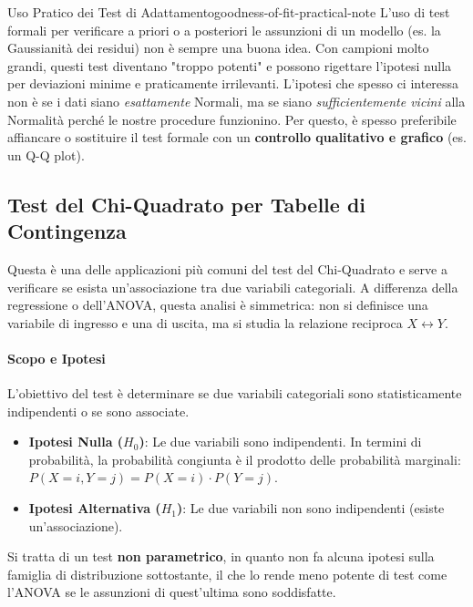 \begin{nota}{Uso Pratico dei Test di
Adattamento}{goodness-of-fit-practical-note}
L'uso di test formali per verificare a priori o a posteriori le assunzioni di un
modello (es. la Gaussianità dei residui) non è sempre una buona idea. Con
campioni molto grandi, questi test diventano "troppo potenti" e possono
rigettare l'ipotesi nulla per deviazioni minime e praticamente irrilevanti.
L'ipotesi che spesso ci interessa non è se i dati siano \textit{esattamente}
Normali, ma se siano \textit{sufficientemente vicini} alla Normalità perché le
nostre procedure funzionino. Per questo, è spesso preferibile affiancare o
sostituire il test formale con un \textbf{controllo qualitativo e grafico} (es.
un Q-Q plot).
\end{nota}



\subsection{Test del Chi-Quadrato per Tabelle di Contingenza}
Questa è una delle applicazioni più comuni del test del Chi-Quadrato e serve a
verificare se esista un'associazione tra due variabili categoriali. A differenza
della regressione o dell'ANOVA, questa analisi è simmetrica: non si definisce
una variabile di ingresso e una di uscita, ma si studia la relazione reciproca
\(X \leftrightarrow Y\).

\paragraph{Scopo e Ipotesi}
L'obiettivo del test è determinare se due variabili categoriali sono
statisticamente indipendenti o se sono associate.
\begin{itemize}
    \item \textbf{Ipotesi Nulla (\(H_0\))}: Le due variabili sono indipendenti.
    In termini di probabilità, la probabilità congiunta è il prodotto delle
    probabilità marginali: \( P(X=i, Y=j) = P(X=i) \cdot P(Y=j) \).
    \item \textbf{Ipotesi Alternativa (\(H_1\))}: Le due variabili non sono
    indipendenti (esiste un'associazione).
\end{itemize}
Si tratta di un test \textbf{non parametrico}, in quanto non fa alcuna ipotesi
sulla famiglia di distribuzione sottostante, il che lo rende meno potente di
test come l'ANOVA se le assunzioni di quest'ultima sono soddisfatte.


